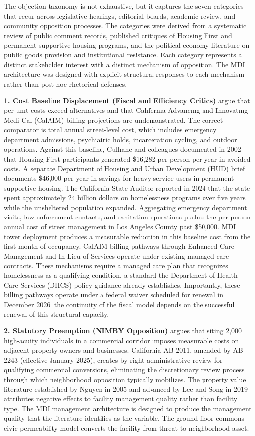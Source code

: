 \documentclass[12pt, letterpaper]{article}
\begin{document}
The objection taxonomy is not exhaustive, but it captures the seven categories that recur across legislative hearings, editorial boards, academic review, and community opposition processes. The categories were derived from a systematic review of public comment records, published critiques of Housing First and permanent supportive housing programs, and the political economy literature on public goods provision and institutional resistance. Each category represents a distinct stakeholder interest with a distinct mechanism of opposition. The MDI architecture was designed with explicit structural responses to each mechanism rather than post-hoc rhetorical defenses.

\textbf{1. Cost Baseline Displacement (Fiscal and Efficiency Critics)} argue that per-unit costs exceed alternatives and that California Advancing and Innovating Medi-Cal (CalAIM) billing projections are undemonstrated. The correct comparator is total annual street-level cost, which includes emergency department admissions, psychiatric holds, incarceration cycling, and outdoor operations. Against this baseline, Culhane and colleagues documented in 2002 that Housing First participants generated \$16,282 per person per year in avoided costs. A separate Department of Housing and Urban Development (HUD) brief documents \$46,000 per year in savings for heavy service users in permanent supportive housing. The California State Auditor reported in 2024 that the state spent approximately 24 billion dollars on homelessness programs over five years while the unsheltered population expanded. Aggregating emergency department visits, law enforcement contacts, and sanitation operations pushes the per-person annual cost of street management in Los Angeles County past \$50,000. MDI tower deployment produces a measurable reduction in this baseline cost from the first month of occupancy. CalAIM billing pathways through Enhanced Care Management and In Lieu of Services operate under existing managed care contracts. These mechanisms require a managed care plan that recognizes homelessness as a qualifying condition, a standard the Department of Health Care Services (DHCS) policy guidance already establishes. Importantly, these billing pathways operate under a federal waiver scheduled for renewal in December 2026; the continuity of the fiscal model depends on the successful renewal of this structural capacity.

\textbf{2. Statutory Preemption (NIMBY Opposition)} argues that siting 2,000 high-acuity individuals in a commercial corridor imposes measurable costs on adjacent property owners and businesses. California AB 2011, amended by AB 2243 (effective January 2025), creates by-right administrative review for qualifying commercial conversions, eliminating the discretionary review process through which neighborhood opposition typically mobilizes. The property value literature established by Nguyen in 2005 and advanced by Lee and Song in 2019 attributes negative effects to facility management quality rather than facility type. The MDI management architecture is designed to produce the management quality that the literature identifies as the variable. The ground floor commons civic permeability model converts the facility from threat to neighborhood asset.
\end{document}
